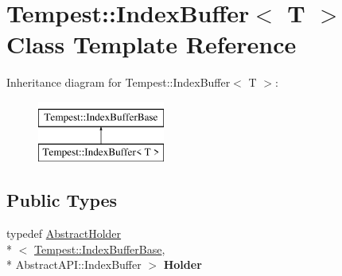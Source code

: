 \hypertarget{class_tempest_1_1_index_buffer}{\section{Tempest\+:\+:Index\+Buffer$<$ T $>$ Class Template Reference}
\label{class_tempest_1_1_index_buffer}
}
Inheritance diagram for Tempest\+:\+:Index\+Buffer$<$ T $>$\+:\begin{figure}[H]
\begin{center}
\leavevmode
\includegraphics[height=2.000000cm]{class_tempest_1_1_index_buffer}
\end{center}
\end{figure}
\subsection*{Public Types}
\begin{DoxyCompactItemize}
\item 
\hypertarget{class_tempest_1_1_index_buffer_a33db416c299b4856313257f6bde12c54}{typedef \hyperlink{class_tempest_1_1_abstract_holder}{Abstract\+Holder}\\*
$<$ \hyperlink{class_tempest_1_1_index_buffer_base}{Tempest\+::\+Index\+Buffer\+Base}, \\*
Abstract\+A\+P\+I\+::\+Index\+Buffer $>$ {\bfseries Holder}}\label{class_tempest_1_1_index_buffer_a33db416c299b4856313257f6bde12c54}

\end{DoxyCompactItemize}
